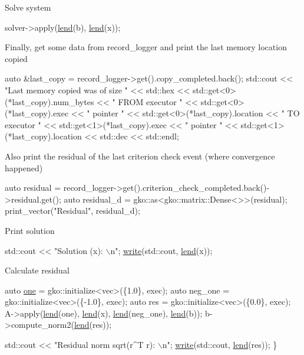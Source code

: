 Solve system


\begin{DoxyCode}
solver->apply(\hyperlink{namespacegko_aa8cb4876b72e5e1036ea9575443c439b}{lend}(b), \hyperlink{namespacegko_aa8cb4876b72e5e1036ea9575443c439b}{lend}(x));
\end{DoxyCode}


Finally, get some data from {\ttfamily record\+\_\+logger} and print the last memory location copied


\begin{DoxyCode}
\textcolor{keyword}{auto} &last\_copy = record\_logger->get().copy\_completed.back();
std::cout << \textcolor{stringliteral}{"Last memory copied was of size "} << std::hex
          << std::get<0>(*last\_copy).num\_bytes << \textcolor{stringliteral}{" FROM executor "}
          << std::get<0>(*last\_copy).exec << \textcolor{stringliteral}{" pointer "}
          << std::get<0>(*last\_copy).location << \textcolor{stringliteral}{" TO executor "}
          << std::get<1>(*last\_copy).exec << \textcolor{stringliteral}{" pointer "}
          << std::get<1>(*last\_copy).location << std::dec << std::endl;
\end{DoxyCode}


Also print the residual of the last criterion check event (where convergence happened)


\begin{DoxyCode}
\textcolor{keyword}{auto} residual =
    record\_logger->get().criterion\_check\_completed.back()->residual.get();
\textcolor{keyword}{auto} residual\_d = gko::as<gko::matrix::Dense<>>(residual);
print\_vector(\textcolor{stringliteral}{"Residual"}, residual\_d);
\end{DoxyCode}


Print solution


\begin{DoxyCode}
std::cout << \textcolor{stringliteral}{"Solution (x): \(\backslash\)n"};
\hyperlink{namespacegko_a859dc47a462721d83728d91ab7fa2148}{write}(std::cout, \hyperlink{namespacegko_aa8cb4876b72e5e1036ea9575443c439b}{lend}(x));
\end{DoxyCode}


Calculate residual


\begin{DoxyCode}
    \textcolor{keyword}{auto} \hyperlink{namespacegko_a0059e27f8f4bc348ff65c1e60caf47c8}{one} = gko::initialize<vec>(\{1.0\}, exec);
    \textcolor{keyword}{auto} neg\_one = gko::initialize<vec>(\{-1.0\}, exec);
    \textcolor{keyword}{auto} res = gko::initialize<vec>(\{0.0\}, exec);
    A->apply(\hyperlink{namespacegko_aa8cb4876b72e5e1036ea9575443c439b}{lend}(one), \hyperlink{namespacegko_aa8cb4876b72e5e1036ea9575443c439b}{lend}(x), \hyperlink{namespacegko_aa8cb4876b72e5e1036ea9575443c439b}{lend}(neg\_one), \hyperlink{namespacegko_aa8cb4876b72e5e1036ea9575443c439b}{lend}(b));
    b->compute\_norm2(\hyperlink{namespacegko_aa8cb4876b72e5e1036ea9575443c439b}{lend}(res));

    std::cout << \textcolor{stringliteral}{"Residual norm sqrt(r^T r): \(\backslash\)n"};
    \hyperlink{namespacegko_a859dc47a462721d83728d91ab7fa2148}{write}(std::cout, \hyperlink{namespacegko_aa8cb4876b72e5e1036ea9575443c439b}{lend}(res));
\}
\end{DoxyCode}
 \label{_Results}%
